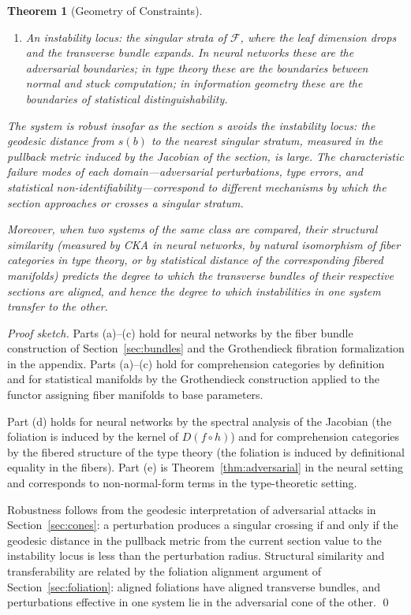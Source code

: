 \documentclass[12pt,a4paper]{article}
\theoremstyle{plain}
\newtheorem{theorem}{Theorem}[section]
\theoremstyle{definition}
\begin{document}
\begin{theorem}[Geometry of Constraints]
\begin{enumerate}[label=\emph{(\alph*)}]
\item An \emph{instability locus}: the singular strata of $\mathcal{F}$,
      where the leaf dimension drops and the transverse bundle expands.
      In neural networks these are the adversarial boundaries; in type theory
      these are the boundaries between normal and stuck computation; in
      information geometry these are the boundaries of statistical
      distinguishability.
\end{enumerate}

The system is \emph{robust} insofar as the section $s$ avoids the
instability locus: the geodesic distance from $s(b)$ to the nearest
singular stratum, measured in the pullback metric induced by the
Jacobian of the section, is large. The characteristic failure modes of
each domain---adversarial perturbations, type errors, and statistical
non-identifiability---correspond to different mechanisms by which the
section approaches or crosses a singular stratum.

Moreover, when two systems of the same class are compared, their
\emph{structural similarity} (measured by CKA in neural networks,
by natural isomorphism of fiber categories in type theory, or by
statistical distance of the corresponding fibered manifolds) predicts
the degree to which the transverse bundles of their respective sections
are aligned, and hence the degree to which instabilities in one system
transfer to the other.
\end{theorem}

\begin{proof}[Proof sketch]
Parts (a)--(c) hold for neural networks by the fiber bundle construction
of Section~\ref{sec:bundles} and the Grothendieck fibration formalization
in the appendix. Parts (a)--(c) hold for comprehension categories by
definition and for statistical manifolds by the Grothendieck construction
applied to the functor assigning fiber manifolds to base parameters.

Part (d) holds for neural networks by the spectral analysis of the Jacobian
(the foliation is induced by the kernel of $D(f \circ h)$) and for
comprehension categories by the fibered structure of the type theory (the
foliation is induced by definitional equality in the fibers). Part (e) is
Theorem~\ref{thm:adversarial} in the neural setting and corresponds to
non-normal-form terms in the type-theoretic setting.

Robustness follows from the geodesic interpretation of adversarial attacks
in Section~\ref{sec:cones}: a perturbation produces a singular crossing if
and only if the geodesic distance in the pullback metric from the current
section value to the instability locus is less than the perturbation radius.
Structural similarity and transferability are related by the foliation
alignment argument of Section~\ref{sec:foliation}: aligned foliations have
aligned transverse bundles, and perturbations effective in one system lie in
the adversarial cone of the other. \qed
\end{proof}
\end{document}
